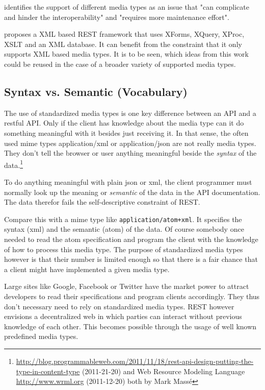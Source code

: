 \documentclass[12pt,a4paper,twoside]{scrartcl}		%
\newcommand{\citeurl}[2]{\url{#1} (#2)}
\begin{document}
\cite[sec. 7.2]{Pautasso:2008:RWS:1367497.1367606} identifies the support of different media types as an issue that "can complicate and hinder the interoperability" and "requires more maintenance effort".

\cite{Davis:2011:XTR:1967428.1967437} proposes a XML based REST framework that uses XForms, XQuery, XProc, XSLT and an XML database. It can benefit from the constraint that it only supports XML based media types. It is to be seen, which ideas from this work could be reused in the case of a broader variety of supported media types.

\subsection{Syntax vs. Semantic (Vocabulary)}

The use of standardized media types is one key difference between an API and a
restful API\cite[sec. 5.2.1.2]{Fielding2000}. Only if the client has knowledge
about the media type can it do something meaningful with it besides just
receiving it. In that sense, the often used mime types application/xml or
application/json are not really media types. They don't tell the browser or user
anything meaningful beside the \emph{syntax} of the data.\footnote{
\citeurl{http://blog.programmableweb.com/2011/11/18/rest-api-design-putting-the-type-in-content-type}{2011-21-20}
and Web Resource Modeling Language \citeurl{http://www.wrml.org}{2011-12-20} both by Mark Massé
}

To do anything meaningful with plain json or xml, the client programmer must
normally look up the meaning or \emph{semantic} of the data in the API
documentation. The data therefor fails the self-descriptive constraint of
REST.

Compare this with a mime type like \texttt{application/atom+xml}. It specifies
the syntax (xml) and the semantic (atom) of the data. Of course somebody once
needed to read the atom specification and program the client with the knowledge
of how to process this media type. The purpose of standardized media types
however is that their number is limited enough so that there is a fair chance
that a client might have implemented a given media type.

Large sites like Google, Facebook or Twitter have the market power to attract
developers to read their specifications and program clients accordingly. They
thus don't necessary need to rely on standardized media types. REST however
envisions a decentralized web in which parties can interact without previous
knowledge of each other. This becomes possible through the usage of well known
predefined media types.
\end{document}
